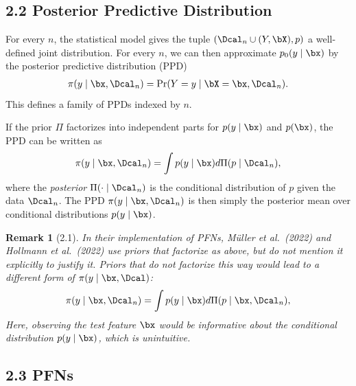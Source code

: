 \documentclass[aspectratio=169,10pt]{beamer}
\newtheorem{remark}[theorem]{Remark}
\newcommand{\currentheading}{\ifx\insertsubsection\empty\insertsection\else\insertsubsection\fi}
\begin{document}
\subsection{2.2 Posterior Predictive Distribution}

\begin{frame}{\currentheading}
For every $n$, the statistical model gives the tuple $(\Dcal_n \cup (Y, \bX), p)$ a well-defined joint distribution. For every $n$, we can then approximate $p_0(y \mid \bx)$ by the posterior predictive distribution (PPD)
\begin{align*}
	\pi(y \mid \bx, \Dcal_n) = \Pr(Y = y \mid \bX = \bx, \Dcal_n).
\end{align*}
This defines a family of PPDs indexed by $n$.
\end{frame}

\begin{frame}{\currentheading}
If the prior $\Pi$ factorizes into independent parts for $p(y \mid \bx)$ and $p(\bx)$, the PPD can be written as
\begin{align*}
	\pi(y \mid \bx, \Dcal_n) = \int p(y \mid \bx) d\Pi(p \mid \Dcal_n),
\end{align*}
where the \emph{posterior} $\Pi(\cdot \mid \Dcal_n)$ is the conditional distribution of $p$ given the data $\Dcal_n$. The PPD $\pi(y \mid \bx, \Dcal_n)$ is then simply the posterior mean over conditional distributions $p(y \mid \bx)$.
\end{frame}

\begin{frame}{\currentheading}
\begin{remark}[2.1]
In their implementation of PFNs, Müller et al.\ (2022) and Hollmann et al.\ (2022) use priors that factorize as above, but do not mention it explicitly to justify it. Priors that do not factorize this way would lead to a different form of $\pi(y \mid \bx, \Dcal)$:
\begin{align*}
	\pi(y \mid \bx, \Dcal_n) = \int p(y \mid \bx) d\Pi(p \mid \bx, \Dcal_n),
\end{align*}
Here, observing the test feature $\bx$ would be informative about the conditional distribution $p(y \mid \bx)$, which is unintuitive.
\end{remark}
\end{frame}

\subsection{2.3 PFNs}
\end{document}

